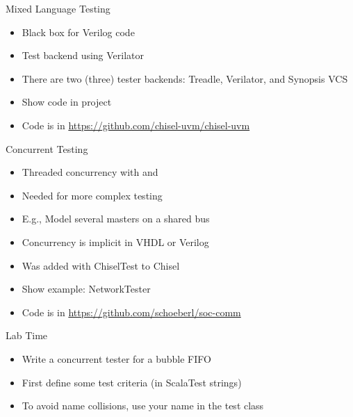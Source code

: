 \begin{frame}[fragile]{Mixed Language Testing}
\begin{itemize}
\item Black box for Verilog code
\item Test backend using Verilator
\item There are two (three) tester backends: Treadle, Verilator, and Synopsis VCS
\item Show code in  project
\item Code is in \url{https://github.com/chisel-uvm/chisel-uvm}
\end{itemize}
\end{frame}

\begin{frame}[fragile]{Concurrent Testing}
\begin{itemize}
\item Threaded concurrency with  and 
\item Needed for more complex testing
\item E.g., Model several masters on a shared bus
\item Concurrency is implicit in VHDL or Verilog
\item Was added with ChiselTest to Chisel
\item Show example: NetworkTester
\item Code is in \url{https://github.com/schoeberl/soc-comm}
\end{itemize}
\end{frame}

\begin{frame}[fragile]{Lab Time}
\begin{itemize}
\item Write a concurrent tester for a bubble FIFO
\item First define some test criteria (in ScalaTest strings)
\item To avoid name collisions, use your name in the test class
\end{itemize}
\end{frame}

